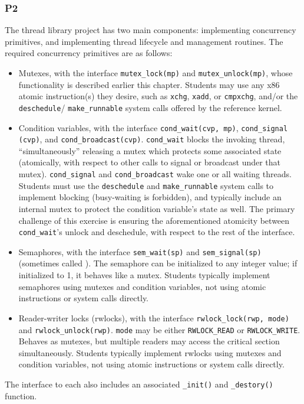 \subsubsection{P2}
The thread library project \cite{thrlib} has two main components: implementing concurrency primitives, and implementing thread lifecycle and management routines.
The required concurrency primitives  are as follows:
\begin{itemize}
	\item Mutexes, with the interface {\tt mutex\_lock(mp)} and {\tt mutex\_unlock(mp)}, whose functionality is described earlier this chapter. Students may use any x86 atomic instruction(s) they desire, such as {\tt xchg}, {\tt xadd}, or {\tt cmpxchg}, and/or the {\tt deschedule}/ {\tt make\_runnable} system calls offered by the reference kernel.
	\item Condition variables, with the interface {\tt cond\_wait(cvp, mp)}, {\tt cond\_signal} {\tt (cvp)}, and {\tt cond\_broadcast(cvp)}. {\tt cond\_wait} blocks the invoking thread, ``simultaneously'' releasing a mutex which protects some associated state (atomically, with respect to other calls to signal or broadcast under that mutex).
		{\tt cond\_signal} and {\tt cond\_broadcast} wake one or all waiting threads.
		Students must use the {\tt deschedule} and {\tt make\_runnable} system calls to implement blocking (busy-waiting is forbidden), and typically include an internal mutex to protect the condition variable's state as well.
		The primary challenge of this exercise is ensuring the aforementioned atomicity between {\tt cond\_wait}'s unlock and deschedule, with respect to the rest of the interface.
	\item Semaphores, with the interface {\tt sem\_wait(sp)} and {\tt sem\_signal(sp)}
		(sometimes called ).
		The semaphore can be initialized to any integer value; if initialized to 1, it behaves like a mutex.
		Students typically implement semaphores using mutexes and condition variables, not using atomic instructions or system calls directly.
	\item Reader-writer locks (rwlocks), with the interface {\tt rwlock\_lock(rwp, mode)} and {\tt rwlock\_unlock(rwp)}. {\tt mode} may be either {\tt RWLOCK\_READ} or {\tt RWLOCK\_\allowbreak{}WRITE}.
		Behaves as mutexes, but multiple readers may access the critical section simultaneously.
		Students typically implement rwlocks using mutexes and condition variables, not using atomic instructions or system calls directly.
\end{itemize}
The interface to each also includes an associated {\tt \_init()} and {\tt \_destory()} function.

